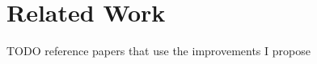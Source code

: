\chapter{Related Work}
\label{cha:Related Work}



TODO reference papers that use the improvements I propose
